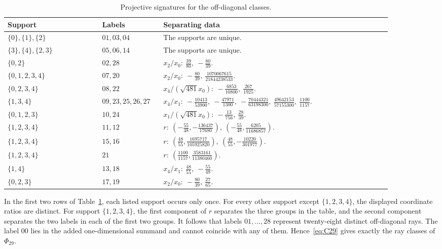 \documentclass[11pt]{article}
\theoremstyle{definition}
\begin{document}
\begin{table}[htbp]
\centering
\caption{Projective signatures for the off-diagonal classes.}
\label{tab:separation}
\scriptsize
\renewcommand{\arraystretch}{1.18}
\begin{tabular}{p{0.22\linewidth} p{0.13\linewidth} p{0.53\linewidth}}
\toprule
Support & Labels & Separating data\\
\midrule
$\{0\},\{1\},\{2\}$ & $01,03,04$ & The supports are unique.\\
$\{3\},\{4\},\{2,3\}$ & $05,06,14$ & The supports are unique.\\
$\{0,2\}$ & $02,28$ &
$x_2/x_0:\ \frac{39}{80},\ -\frac{80}{39}$.\\
$\{0,1,2,3,4\}$ & $07,20$ &
$x_2/x_0:\ -\frac{80}{39},\ \frac{1070067615}{21844238533}$.\\
$\{0,2,3,4\}$ & $08,22$ &
$x_4/(\sqrt{481}x_0):\ -\frac{6853}{10800},\ \frac{267}{1925}$.\\
$\{1,3,4\}$ & $09,23,25,26,27$ &
$x_4/x_1:\ -\frac{10413}{53900},\ -\frac{47971}{1300},\
-\frac{70444321}{63198300},\ \frac{49642153}{57155300},\
\frac{1100}{1157}$.\\
$\{0,1,2,3\}$ & $10,24$ &
$x_1/(\sqrt{481}x_0):\ -\frac{13}{756},\ \frac{28}{39}$.\\
$\{1,2,3,4\}$ & $11,12$ &
$r:\ (-\frac{55}{48},-\frac{136437}{17680}),\
(-\frac{55}{48},\frac{6205}{11686857})$.\\
$\{1,2,3,4\}$ & $15,16$ &
$r:\ (\frac{48}{55},\frac{1695717}{105925820}),\
(\frac{48}{55},-\frac{10220}{301977})$.\\
$\{1,2,3,4\}$ & $21$ &
$r:\ (\frac{1100}{1157},\frac{3583161}{11380460})$.\\
$\{1,4\}$ & $13,18$ &
$x_4/x_1:\ \frac{48}{55},\ -\frac{55}{48}$.\\
$\{0,2,3\}$ & $17,19$ &
$x_2/x_0:\ -\frac{80}{39},\ \frac{27}{65}$.\\
\bottomrule
\end{tabular}
\end{table}

In the first two rows of Table~\ref{tab:separation}, each listed support occurs
only once.  For every other support except $\{1,2,3,4\}$, the displayed
coordinate ratios are distinct.  For support $\{1,2,3,4\}$, the first
component of $r$ separates the three groups in the table, and the second
component separates the two labels in each of the first two groups.  It
follows that labels $01,\ldots,28$ represent twenty-eight distinct
off-diagonal rays.  The label $00$ lies in the added one-dimensional summand
and cannot coincide with any of them.  Hence~\eqref{eq:C29} gives exactly the
ray classes of $\Phi_{29}$.
\end{document}
